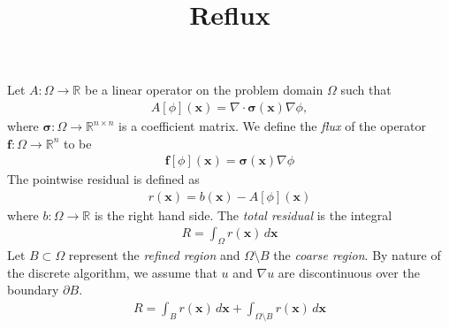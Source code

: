 \documentclass{article}
\title{Reflux}
\begin{document}
\maketitle

\def\flux{\operatorname{Flux}}


Let $A:\Omega\to\mathbb{R}$ be a linear operator on the problem domain $\Omega$ such that
\begin{align}
  A[\phi](\bm{x}) = \nabla\cdot\bm{\sigma}(\bm{x})\nabla\phi, 
\end{align}
where $\bm{\sigma}:\Omega\to\mathbb{R}^{n\times n}$ is a coefficient matrix.
We define the {\it flux} of the operator $\bm{f}:\Omega\to\mathbb{R}^n$ to be 
\begin{align}
  \bm{f}[\phi](\bm{x}) = \bm{\sigma}(\bm{x})\nabla\phi
\end{align}
The pointwise residual is defined as 
\begin{align}
  r(\bm{x}) = b(\bm{x}) - A[\phi](\bm{x})
\end{align}
where $b:\Omega\to\mathbb{R}$ is the right hand side.
The {\it total residual} is the integral 
\begin{align}
  R = \int_\Omega r(\bm{x})\,d\bm{x}
\end{align}
Let $B\subset\Omega$ represent the {\it refined region} and $\Omega\setminus B$ the {\it coarse region}.
By nature of the discrete algorithm, we assume that $u$ and $\nabla u$ are discontinuous over the boundary $\partial B$.
\begin{align}
  R = \int_{B} r(\bm{x})\,d\bm{x} + \int_{\Omega\setminus B} r(\bm{x})\,d\bm{x}
\end{align}
\end{document}
